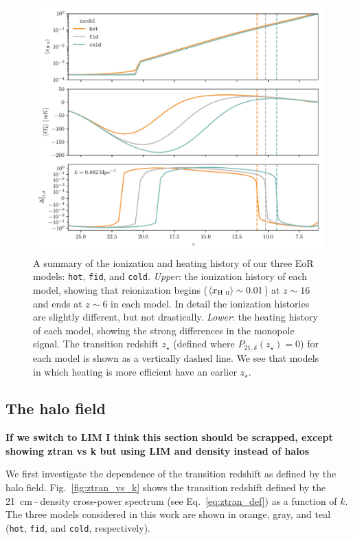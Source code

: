 \documentclass[a4paper,fleqn,usenatbib]{mnras}
\newcommand{\avg}[1]{\ensuremath{\langle #1 \rangle}}
\newcommand{\HII}{\ensuremath{\text{H~\textsc{ii}}}}
\newcommand{\fid}{\texttt{fid}}
\newcommand{\hot}{\texttt{hot}}
\newcommand{\cold}{\texttt{cold}}
\newcommand{\zst}{\ensuremath{z_{\star}}}
\begin{document}
\begin{figure}
\includegraphics[width=\textwidth]{plots/aveTb_nf.pdf}
\caption{A summary of the ionization and heating history of our three EoR
models: \hot{}, \fid{}, and \cold{}. \textit{Upper}: the ionization history of
each model, showing that reionization begins ($\avg{x_{\HII}}\sim0.01$) at
$z\sim16$ and ends at $z\sim6$ in each model. In detail the ionization
histories are slightly different, but not drastically. \textit{Lower}: the
heating history of each model, showing the strong differences in the monopole
signal. The transition redshift \zst{} (defined where $P_{21,\delta}(\zst{}) =
0$) for each model is shown as a vertically dashed line. We see that models in
which heating is more efficient have an earlier \zst{}.}
\label{fig:aveTb_nf}
\end{figure}

\subsection{The halo field}
{\bf If we switch to LIM I think this section should be scrapped, except
showing ztran vs k but using LIM and density instead of halos}

We first investigate the dependence of the transition redshift as defined by
the halo field. Fig.~\ref{fig:ztran_vs_k} shows the transition redshift
defined by the 21~cm\,--\,density cross-power spectrum (see
Eq.~\ref{eq:ztran_def}) as a function of $k$. The three models considered in
this work are shown in orange, gray, and teal (\hot{}, \fid{}, and \cold{},
respectively).
\end{document}
